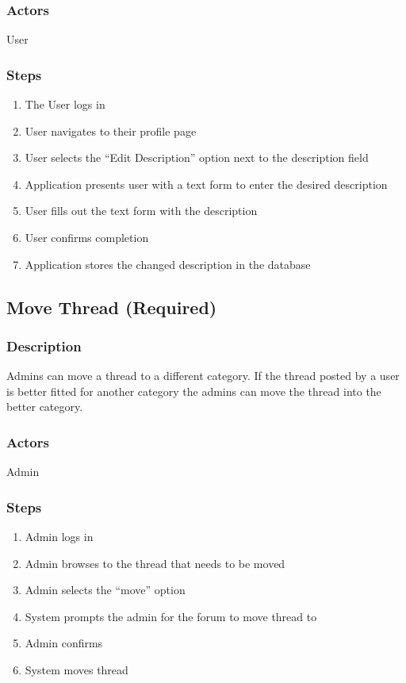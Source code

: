 \documentclass[12pt]{scrartcl}
\begin{document}
\subsubsection {Actors}
User

\subsubsection {Steps}
\begin {enumerate}
\item The User logs in
\item User navigates to their profile page
\item User selects the “Edit Description” option next to the description field
\item Application presents user with a text form to enter the desired description
\item User fills out the text form with the description
\item User confirms completion
\item Application stores the changed description in the database
\end {enumerate}


\subsection{Move Thread (Required)}
\subsubsection{Description}
Admins can move a thread to a different category.
If the thread posted by a user is better fitted for another category the admins can move the thread into the better category. 

\subsubsection{Actors}

Admin

\subsubsection{Steps}
\begin {enumerate}
\item Admin logs in
\item Admin browses to the thread that needs to be moved
\item Admin selects the “move” option
\item System prompts the admin for the forum to move thread to
\item Admin confirms
\item System moves thread
\end {enumerate}
\end{document}

